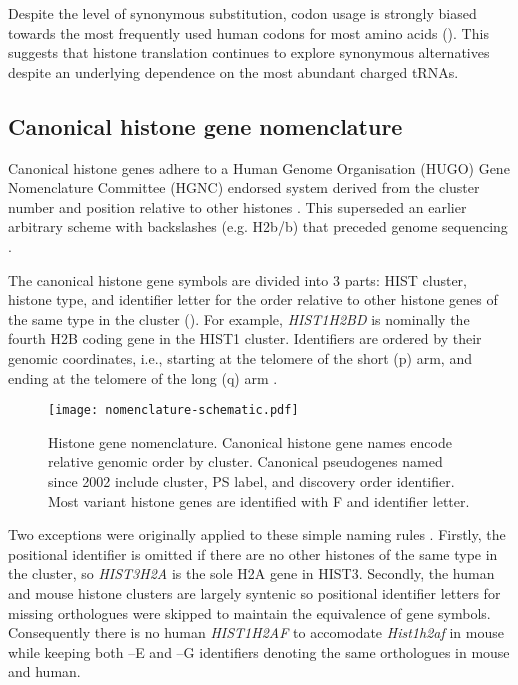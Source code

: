     Despite the level of synonymous substitution,
    codon usage is strongly biased towards the most frequently used human codons for most amino acids ().
    This suggests that histone translation continues to explore synonymous alternatives
    despite an underlying dependence on the most abundant charged tRNAs.

  \subsection{Canonical histone gene nomenclature}
    Canonical histone genes adhere to a Human Genome Organisation (HUGO) Gene Nomenclature Committee (HGNC)
    endorsed system derived from the cluster number and position relative to other histones \citep{Marzluff02}.
    This superseded an earlier arbitrary scheme with backslashes (e.g. H2b/b)
    that preceded genome sequencing \citep{AlbigGenomics1997,AlbigHumangen1997}.

    The canonical histone gene symbols are divided into 3 parts:
    HIST cluster, histone type, and identifier letter
    for the order relative to other histone genes of the same type in the cluster ().
    For example, \textit{HIST1H2BD} is nominally the fourth H2B coding gene in the HIST1 cluster.
    Identifiers are ordered by their genomic coordinates, i.e., starting at
    the telomere of the short (p) arm, and ending at the telomere of the
    long (q) arm \citep{Marzluff02}.

    \begin{figure*}
      \centering
      \texttt{[image: nomenclature-schematic.pdf]}
      \caption{Histone gene nomenclature.
               Canonical histone gene names encode relative genomic order by cluster.
               Canonical pseudogenes named since 2002 include cluster, PS label, and discovery order identifier.
               Most variant histone genes are identified with F and identifier letter.}
      \label{fig:nomenclature}
    \end{figure*}

    Two exceptions were originally applied to these simple naming rules \citep{Marzluff02}.
    Firstly, the positional identifier is omitted if there are no other histones of the same type in the cluster,
    so \textit{HIST3H2A} is the sole H2A gene in HIST3.
    Secondly, the human and mouse histone clusters are largely syntenic
    so positional identifier letters for missing orthologues were skipped to maintain the equivalence of gene symbols.
    Consequently there is no human \textit{HIST1H2AF} to accomodate
    \textit{Hist1h2af} in mouse while keeping both --E and --G identifiers
    denoting the same orthologues in mouse and human.

